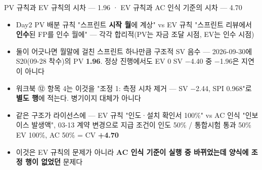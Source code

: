 \begin{frame}[shrink=13]{PV 규칙과 EV 규칙의 시차 — 1.96 · EV 규칙과 AC 인식 기준의 시차 — 4.70}
\begin{itemize}
\item Day2 PV 배분 규칙 "스프린트 \textbf{시작 월}에 계상" vs EV 규칙 "스프린트 리뷰에서 \textbf{인수}된 FP를 인수 월에" — 각각 합리적(PV는 자금 조달 시점, EV는 인수 시점)
\item 둘이 어긋나면 월말에 걸친 스프린트 하나만큼 구조적 SV 음수 — 2026-09-30에 S20(09-28 착수)의 PV \textbf{1.96}. 정상 진행에서도 EV 0 \ra{} SV $-$4.40 중 $-$1.96은 지연이 아니다
\item 워크북 ⑫ 항목 4는 이것을 "조정 1: 측정 시차 제거 — SV $-$2.44, SPI 0.968"로 \textbf{별도 행}에 적는다. 병기이지 대체가 아니다
\item 같은 구조가 라이선스에 — EV 규칙 "인도·설치 확인서 100\%" vs AC 인식 "인보이스 발생액", 03-13 계약 변경으로 지급 조건이 인도 50\% / 통합시험 통과 50\% \ra{} EV 100\%, AC 50\% = CV \textbf{+4.70}
\item 이것은 EV 규칙의 문제가 아니라 \textbf{AC 인식 기준이 실행 중 바뀌었는데 양식에 조정 행이 없었던} 문제다
\end{itemize}
\end{frame}

